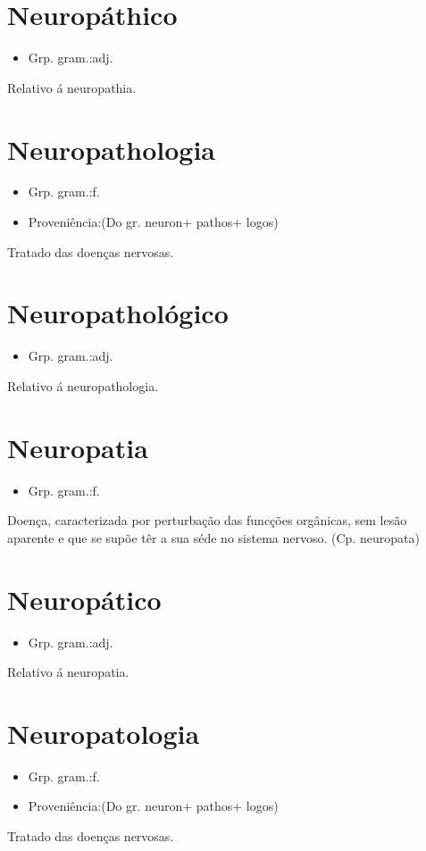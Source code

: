 \section{Neuropáthico}
\begin{itemize}
\item {Grp. gram.:adj.}
\end{itemize}
Relativo á neuropathia.
\section{Neuropathologia}
\begin{itemize}
\item {Grp. gram.:f.}
\end{itemize}
\begin{itemize}
\item {Proveniência:(Do gr. \textunderscore neuron\textunderscore  + \textunderscore pathos\textunderscore  + \textunderscore logos\textunderscore )}
\end{itemize}
Tratado das doenças nervosas.
\section{Neuropathológico}
\begin{itemize}
\item {Grp. gram.:adj.}
\end{itemize}
Relativo á neuropathologia.
\section{Neuropatia}
\begin{itemize}
\item {Grp. gram.:f.}
\end{itemize}
Doença, caracterizada por perturbação das funcções orgânicas, sem lesão aparente e que se supõe têr a sua séde no sistema nervoso.
(Cp. \textunderscore neuropata\textunderscore )
\section{Neuropático}
\begin{itemize}
\item {Grp. gram.:adj.}
\end{itemize}
Relativo á neuropatia.
\section{Neuropatologia}
\begin{itemize}
\item {Grp. gram.:f.}
\end{itemize}
\begin{itemize}
\item {Proveniência:(Do gr. \textunderscore neuron\textunderscore  + \textunderscore pathos\textunderscore  + \textunderscore logos\textunderscore )}
\end{itemize}
Tratado das doenças nervosas.
